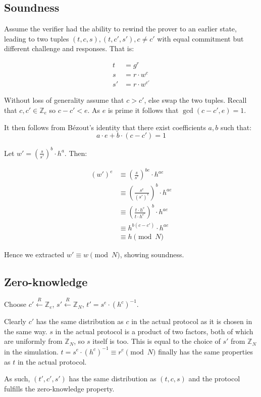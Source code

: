 \documentclass[a4paper]{scrreprt}
\begin{document}
\subsection{Soundness}

Assume the verifier had the ability to rewind the prover to an earlier state,
leading to two tuples $(t, c, s), (t, c', s'), c \neq c'$ with equal commitment
but different challenge and responses. That is:

\begin{align*}
		t & = g^r \\
		s & = r \cdot w^c \\
		s' & = r \cdot w^{c'}
\end{align*}

Without loss of generality assume that $c > c'$, else swap the two tuples.
Recall that $c, c' \in \mathbb{Z}_e$ so $c - c' < e$. As $e$ is prime it
follows that $\operatorname{gcd}(c - c', e) = 1$.

It then follows from Bézout's identity that there exist coefficients $a, b$
such that:
\[
		a \cdot e + b \cdot (c - c') = 1
\]

Let $w' = \left(\frac{s}{s'}\right)^b \cdot h^a$. Then:

\begin{align*}
		(w')^e & \equiv \left(\frac{s}{s'}\right)^{be} \cdot h^{ae} \\
			   & \equiv \left(\frac{s^e}{(s')^e}\right)^{b} \cdot h^{ae} \\
			   & \equiv \left(\frac{t \cdot h^c}{t \cdot h^{c'}}\right)^{b} \cdot h^{ae} \\
			   & \equiv h^{b (c - c')} \cdot h^{ae} \\
			   & \equiv h \pmod{N}
\end{align*}

Hence we extracted $w' \equiv w \pmod{N}$, showing soundness.

\subsection{Zero-knowledge}

Choose $c' \xleftarrow{R} \mathbb{Z}_e$, $s' \xleftarrow{R} \mathbb{Z}_N$, $t' =
s^e \cdot (h^c)^{-1}$.

Clearly $c'$ has the same distribution as $c$ in the actual protocol as it is
chosen in the same way. $s$ in the actual protocol is a product of two factors,
both of which are uniformly from $\mathbb{Z}_N$, so $s$ itself is too. This is
equal to the choice of $s'$ from $\mathbb{Z}_N$ in the simulation. $t = s^e
\cdot (h^c)^{-1} \equiv r^e \pmod{N}$ finally has the same properties as $t$ in
the actual protocol.

As such, $(t', c', s')$ has the same distribution as $(t, c, s)$ and the
protocol fulfills the zero-knowledge property.
\end{document}
